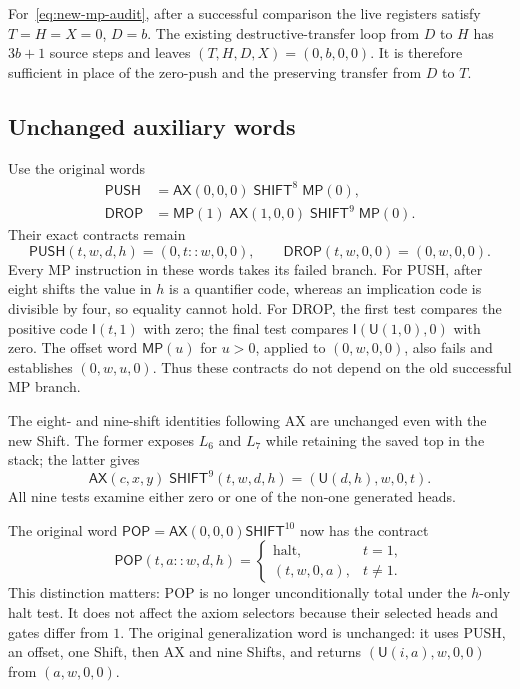 For~\eqref{eq:new-mp-audit}, after a successful comparison the live
registers satisfy $T=H=X=0$, $D=b$. The existing destructive-transfer
loop from $D$ to $H$ has $3b+1$ source steps and leaves
$(T,H,D,X)=(0,b,0,0)$. It is therefore sufficient in place of the
zero-push and the preserving transfer from $D$ to $T$.

\subsection{Unchanged auxiliary words}

Use the original words
\[
\begin{split}
 \mathsf{PUSH}&=\mathsf{AX}(0,0,0)\;\mathsf{SHIFT}^{8}\;\mathsf{MP}(0),\\
 \mathsf{DROP}&=\mathsf{MP}(1)\;\mathsf{AX}(1,0,0)\;
                   \mathsf{SHIFT}^{9}\;\mathsf{MP}(0).
\end{split}
\]
Their exact contracts remain
\[
 \mathsf{PUSH}(t,w,d,h)=(0,t::w,0,0),\qquad
 \mathsf{DROP}(t,w,0,0)=(0,w,0,0).
\]
Every MP instruction in these words takes its failed branch. For PUSH,
after eight shifts the value in $h$ is a quantifier code, whereas an
implication code is divisible by four, so equality cannot hold. For DROP,
the first test compares the positive code $\mathsf I(t,1)$ with zero;
the final test compares $\mathsf I(\mathsf U(1,0),0)$ with zero.
The offset word $\mathsf{MP}(u)$ for $u>0$, applied to $(0,w,0,0)$,
also fails and establishes $(0,w,u,0)$. Thus these contracts do not depend
on the old successful MP branch.

The eight- and nine-shift identities following AX are unchanged even with
the new Shift. The former exposes $L_6$ and $L_7$ while retaining the saved
top in the stack; the latter gives
\begin{equation}\label{eq:ax-nine-audit}
 \mathsf{AX}(c,x,y)\;\mathsf{SHIFT}^{9}(t,w,d,h)
       =(\mathsf U(d,h),w,0,t).
\end{equation}
All nine tests examine either zero or one of the non-one generated heads.

The original word $\mathsf{POP}=\mathsf{AX}(0,0,0)\mathsf{SHIFT}^{10}$
now has the contract
\[
 \mathsf{POP}(t,a::w,d,h)=
 \begin{cases}
 \text{halt},&t=1,\\
 (t,w,0,a),&t\ne1.
 \end{cases}
\]
This distinction matters: POP is no longer unconditionally total under
the $h$-only halt test. It does not affect the axiom selectors because
their selected heads and gates differ from $1$. The original
generalization word is unchanged: it uses PUSH, an offset, one Shift,
then AX and nine Shifts, and returns
$(\mathsf U(i,a),w,0,0)$ from $(a,w,0,0)$.

